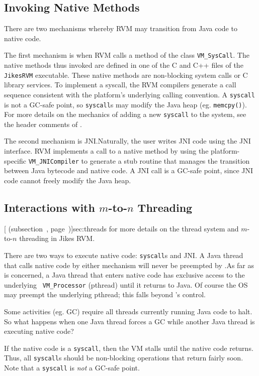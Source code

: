\subsection{Invoking Native Methods}
There are two mechanisms whereby RVM may transition from Java code to native
code.

%
The first mechanism is when RVM calls a method of the class {\tt VM\_SysCall}.
The native methods thus invoked are defined in one of the
C and C++ files of the {\tt JikesRVM} executable. 
These native methods are non-blocking system calls or C library 
services.  To implement a syscall, the RVM compilers generate a call
sequence consistent with the platform's underlying calling convention.
A {\tt syscall} is not a GC-safe point, so {\tt syscall}s may modify the
Java heap (eg. {\tt memcpy()}). For more details on the mechanics of adding a
new \texttt{syscall} to the system, see the header comments of 
.

The second mechanism is JNI.\@  Naturally, the user writes JNI code
using the JNI interface.  RVM implements a call to a native method by
using the platform-specific {\tt VM\_JNICompiler} to generate a stub
routine that manages the transition between Java bytecode and native
code.  A JNI call is a GC-safe point, since JNI code cannot freely
modify the Java heap. 

\subsection{Interactions with $m$-to-$n$ Threading}
[ (subsection~\Ref,
page~\Pageref)]{sec:threads} for more details on the thread system
and $m$-to-$n$ threading in Jikes RVM.\@ 

There are two ways to execute native code: {\tt syscall}s and JNI.\@
A Java thread that calls native code by either mechanism will never
be preempted by \jrvm{}.\@  As far as \jrvm{} is concerned, a Java thread that
enters native code has exclusive access to the underlying {\tt
VM\_Processor} (pthread) until it returns to Java.  Of course the OS may preempt the underlying
pthread; this falls beyond \jrvm{}'s control.

Some activities (eg. GC) require all threads currently running Java code to halt.  
So what happens when one Java thread forces a GC while another Java thread is
executing native code?

If the native code is a {\tt syscall}, then the VM stalls until the native
code returns.  Thus, all {\tt syscall}s should be non-blocking
operations that return fairly soon.  Note that a {\tt syscall} is 
{\em not} a GC-safe point.

